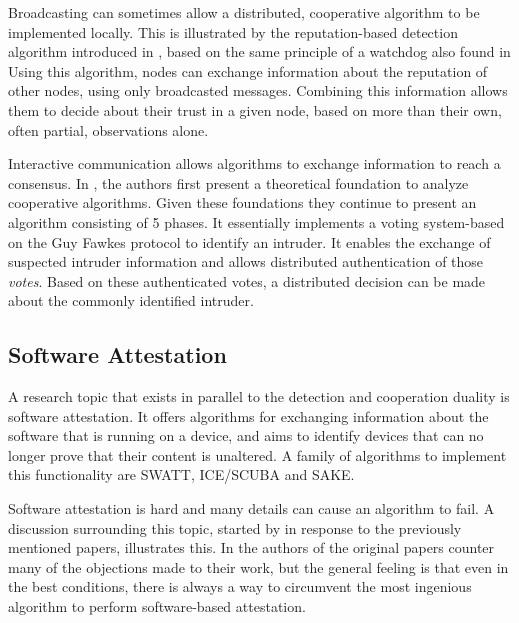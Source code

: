 \documentclass[conference]{IEEEtran}
\begin{document}
\begin{LaTeXdescription}

  \item[Broadcasting] can sometimes allow a distributed, cooperative algorithm
  to be implemented locally. This is illustrated by the reputation-based
  detection algorithm introduced in \cite{ganeriwal2008reputation}, based on
  the same principle of a watchdog also found in \cite{mishra2004intrusion}
  Using this algorithm, nodes can exchange information about the reputation of
  other nodes, using only broadcasted messages. Combining this information
  allows them to decide about their trust in a given node, based on more than
  their own, often partial, observations alone.

  \item[Interactive] communication allows algorithms to exchange information to
  reach a consensus. In \cite{krontiris2009cooperative}, the authors first
  present a theoretical foundation to analyze cooperative algorithms. Given
  these foundations they continue to present an algorithm consisting of 5
  phases. It essentially implements a voting system-based on the Guy Fawkes
  protocol\cite{anderson1998new} to identify an intruder. It enables the
  exchange of suspected intruder information and allows distributed
  authentication of those \emph{votes}. Based on these authenticated votes, a
  distributed decision can be made about the commonly identified intruder.

\end{LaTeXdescription}

\subsection*{Software Attestation}
\label{subsection:attestation}

A research topic that exists in parallel to the detection and cooperation
duality is software attestation. It offers algorithms for exchanging
information about the software that is running on a device, and aims to
identify devices that can no longer prove that their content is unaltered. A
family of algorithms to implement this functionality are
SWATT\cite{seshadri2004swatt}, ICE/SCUBA\cite{seshadri2006scuba} and
SAKE\cite{seshadri2008sake}.

Software attestation is hard and many details can cause an algorithm to fail. A
discussion surrounding this topic, started by \cite{castelluccia2009difficulty}
in response to the previously mentioned papers, illustrates this. In
\cite{perrig2010refutation} the authors of the original papers counter many of
the objections made to their work, but the general feeling is that even in the
best conditions, there is always a way to circumvent the most ingenious
algorithm to perform software-based attestation.
\end{document}
